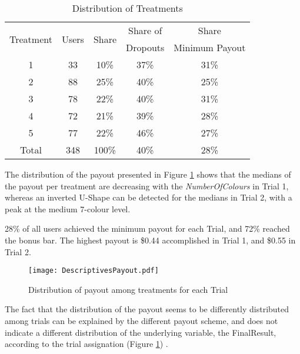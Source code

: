 \begin{table}[htbp] %
  \centering
  \caption{Distribution of Treatments}
    \label{Distributionoftreatments}
    \begin{tabular}{ccccc}
    \toprule
    \multirow{2}[1]{*}{Treatment} & \multirow{2}[1]{*}{Users} & \multirow{2}[1]{*}{Share} & Share of  & Share\\
    						   &						&  						 &	Dropouts\footnotemark & Minimum Payout\\
    \midrule
    1     & 33    & 10\%  & 37\% & 31\%\\
    2     & 88    & 25\%  & 40\% & 25\%\\
    3     & 78    & 22\%  & 40\% & 31\%\\
    4     & 72    & 21\%  & 39\% & 28\%\\
    5     & 77    & 22\%  & 46\% & 27\%\\
    
    \bottomrule
    Total & 348   & 100\% & 40\% & 28\%\\
    \end{tabular}%
\end{table}%

The distribution of the payout presented in Figure \ref{Distributionofpayout} shows that the medians of the payout per treatment are decreasing with the \textit{NumberOfColours} in Trial 1, whereas an inverted U-Shape can be detected for the medians in Trial 2, with a peak at the medium 7-colour level.

28\% of all users achieved the minimum payout for each Trial, and 72\% reached the bonus bar. The highest payout is \$0.44 accomplished in Trial 1, and \$0.55 in Trial 2. 
 \begin{figure}[t] %
\begin{center} 
  \caption{Distribution of payout among treatments for each Trial}
  \label{Distributionofpayout}
  \texttt{[image: DescriptivesPayout.pdf]} 
\end{center}
\end{figure}

The fact that the distribution of the payout seems to be differently distributed among trials can be explained by the different payout scheme, and does not indicate a different distribution of the underlying variable, the FinalResult, according to the trial assignation (Figure \ref{Distributionofpayout}) .
